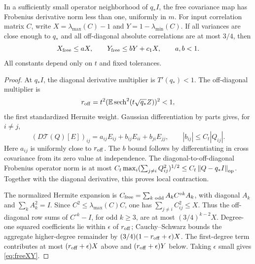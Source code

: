 \documentclass[11pt]{article}
\newcommand{\norm}[1]{\left\lVert#1\right\rVert}
\begin{document}
\begin{lemma}\label{lem:free-matrix}
In a sufficiently small operator neighborhood of $q_*I$, the free covariance map has Frobenius derivative norm less than one, uniformly in $m$. For input correlation matrix $C$, write $X=\lambda_{\max}(C)-1$ and $Y=1-\lambda_{\min}(C)$. If all variances are close enough to $q_*$ and all off-diagonal absolute correlations are at most $3/4$, then
\begin{equation}\label{eq:freeXY}
 X_{\rm free}\le aX,\qquad Y_{\rm free}\le bY+c_1X,
 \qquad a,b<1.
\end{equation}
All constants depend only on $t$ and fixed tolerances.
\end{lemma}
\begin{proof}
At $q_*I$, the diagonal derivative multiplier is $T'(q_*)<1$. The off-diagonal multiplier is
\[r_{\rm off}=t^2(\mathbb E\operatorname{sech}^2(t\sqrt{q_*}Z))^2<1,\]
the first standardized Hermite weight. Gaussian differentiation by parts gives, for $i\ne j$,
\[
 (D\mathcal T(Q)[E])_{ij}=a_{ij}E_{ij}+b_{ij}E_{ii}+b_{ji}E_{jj},
 \qquad |b_{ij}|\le C_t|Q_{ij}|.
\]
Here $a_{ij}$ is uniformly close to $r_{\rm off}$. The $b$ bound follows by differentiating in cross covariance from its zero value at independence. The diagonal-to-off-diagonal Frobenius operator norm is at most
$C_t\max_i(\sum_{j\ne i}Q_{ij}^2)^{1/2}\le C_t\norm{Q-q_*I}_{\op}$.
Together with the diagonal derivative, this proves local contraction.

The normalized Hermite expansion is
$C_{\rm free}=\sum_{k\text{ odd}}A_k C^{\circ k}A_k$, with diagonal $A_k$ and $\sum_kA_k^2=I$. Since $C^2\le\lambda_{\max}(C)C$, one has $\sum_{j\ne i}C_{ij}^2\le X$. Thus the off-diagonal row sums of $C^{\circ k}-I$, for odd $k\ge3$, are at most $(3/4)^{k-2}X$. Degree-one squared coefficients lie within $\epsilon$ of $r_{\rm off}$; Cauchy--Schwarz bounds the aggregate higher-degree remainder by $(3/4)(1-r_{\rm off}+\epsilon)X$. The first-degree term contributes at most $(r_{\rm off}+\epsilon)X$ above and $(r_{\rm off}+\epsilon)Y$ below. Taking $\epsilon$ small gives \eqref{eq:freeXY}.
\end{proof}
\end{document}
